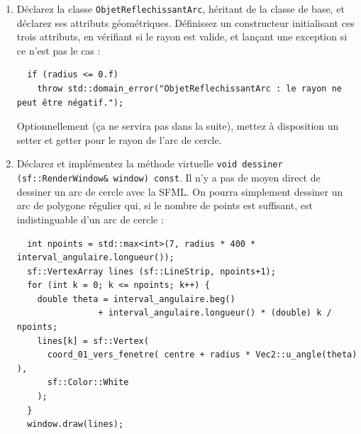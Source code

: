 \documentclass{book}
\newcommand{\inline}[1]{\texttt{#1}}
\begin{document}
\begin{enumerate}

  \item Déclarez la classe \inline{ObjetReflechissantArc}, héritant de la classe de base, et déclarez ses attributs géométriques. Définissez un constructeur initialisant ces trois attributs, en vérifiant si le rayon est valide, et lançant une exception si ce n'est pas le cas :
  \begin{verbatim}
  if (radius <= 0.f)
    throw std::domain_error("ObjetReflechissantArc : le rayon ne peut être négatif.");
  \end{verbatim}
  Optionnellement (ça ne servira pas dans la suite), mettez à disposition un setter et getter pour le rayon de l'arc de cercle.

  \item Déclarez et implémentez la méthode virtuelle \inline{void dessiner (sf::RenderWindow& window) const}. Il n'y a pas de moyen direct de dessiner un arc de cercle avec la SFML. On pourra simplement dessiner un arc de polygone régulier qui, si le nombre de points est suffisant, est indistinguable d'un arc de cercle :
  \begin{verbatim}
  int npoints = std::max<int>(7, radius * 400 * interval_angulaire.longueur());
  sf::VertexArray lines (sf::LineStrip, npoints+1);
  for (int k = 0; k <= npoints; k++) {
    double theta = interval_angulaire.beg()
                + interval_angulaire.longueur() * (double) k / npoints;
    lines[k] = sf::Vertex(
      coord_01_vers_fenetre( centre + radius * Vec2::u_angle(theta) ),
      sf::Color::White
    ); 
  }
  window.draw(lines);
  \end{verbatim}


\end{enumerate}
\end{document}
